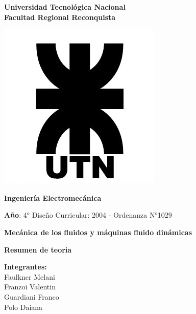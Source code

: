 \documentclass[a4paper, 15pt,titlepage]{article}
\begin{document}
	\begin{titlepage}
		\begin{center}		
			{\huge \textbf{Universidad Tecnológica Nacional}}\\
			{\huge \textbf{Facultad Regional Reconquista}}
			
			\vspace{1cm}
			
			\includegraphics[width=0.40\linewidth]{UTNLOGO}\\
			
			\vspace{1cm}
			
			{\huge\textbf{Ingeniería Electromecánica}}
			
			\vspace{1cm}
			
			{\textbf{Año}: 4°} \hspace{5cm}  {Diseño Curricular: 2004 - Ordenanza N°1029 }
			
			\vspace{1cm}
			
			{{\LARGE  \textbf{Mecánica de los fluidos y máquinas fluido dinámicas}}}
			\vspace{1cm}
			
			{\LARGE \textbf{Resumen de teoria}}
			
		\end{center}
		
		\begin{flushleft}
			\Large
			\textbf{Integrantes:}\\
			\vspace{5mm}
			\hspace{3cm}Faulkner Melani\\
			\vspace{5mm}
			\hspace{3cm}Franzoi Valentin\\
			\vspace{5mm}
			\hspace{3cm}Guardiani Franco\\
			\vspace{5mm}
			\hspace{3cm}Polo Daiana
			
		\end{flushleft}
	\end{titlepage}
	
	
\end{document}
